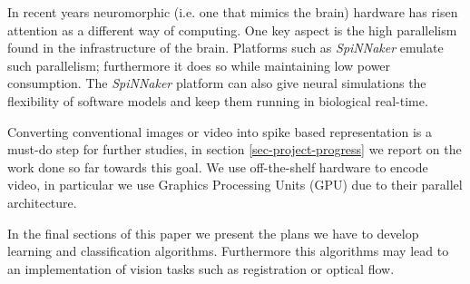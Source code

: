 In recent years neuromorphic (i.e. one that mimics the brain) hardware has
risen attention as a different way of computing. One key aspect is the high
parallelism found in the infrastructure of the brain. Platforms such as
\emph{SpiNNaker} \cite{furber2013overview} emulate such parallelism; furthermore
it does so while maintaining low power consumption. The \emph{SpiNNaker}
platform can also give neural simulations the flexibility of software models
and keep them running in biological real-time.

Converting conventional images or video into spike based representation is a
must-do step for further studies, in section \ref{sec-project-progress} we
report on the work done so far towards this goal. We use off-the-shelf hardware
to encode video, in particular we use Graphics Processing Units (GPU) due to 
their parallel architecture. 

In the final sections of this paper we present the plans we have to develop 
learning and classification algorithms. Furthermore this algorithms may lead to 
an implementation of vision tasks such as registration or optical flow.
